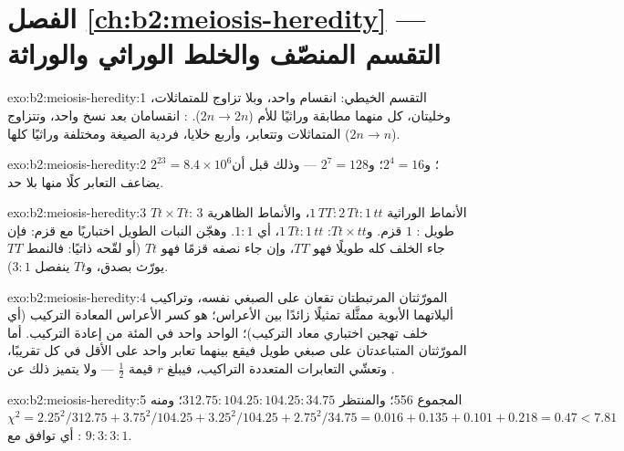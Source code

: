\section*{الفصل \ref{ch:b2:meiosis-heredity} --- التقسم المنصّف والخلط الوراثي والوراثة}

\begin{solution}{exo:b2:meiosis-heredity:1}
التقسم الخيطي: انقسام واحد، وبلا تزاوج للمتماثلات، وخليتان، كل منهما
مطابقة وراثيًا للأم ($2n \to 2n$). : انقسامان بعد نسخ
واحد، وتتزاوج المتماثلات وتتعابر، وأربع خلايا، فردية الصيغة ومختلفة
وراثيًا كلها ($2n \to n$).
\end{solution}

\begin{solution}{exo:b2:meiosis-heredity:2}
$2^{23} = 8.4\times 10^{6}$؛ و$2^{4} = 16$؛ و$2^{7} = 128$ --- وذلك
قبل أن يضاعف التعابر كلًا منها بلا حد.
\end{solution}

\begin{solution}{exo:b2:meiosis-heredity:3}
$Tt\times Tt$: الأنماط الوراثية $1\,TT : 2\,Tt : 1\,tt$، والأنماط
الظاهرية $3$ طويل : $1$ قزم. و$Tt\times tt$: $1\,Tt : 1\,tt$، أي
$1 : 1$. وهجّن النبات الطويل اختباريًا مع قزم: فإن جاء الخلف كله
طويلًا فهو $TT$، وإن جاء نصفه قزمًا فهو $Tt$ (أو لقّحه ذاتيًا:
فالنمط $TT$ يورّث بصدق، و$Tt$ ينفصل $3 : 1$).
\end{solution}

\begin{solution}{exo:b2:meiosis-heredity:4}
المورّثتان المرتبطتان تقعان على الصبغي نفسه، وتراكيب أليلاتهما
الأبوية ممثَّلة تمثيلًا زائدًا بين الأعراس؛  هو
كسر الأعراس المعادة التركيب (أي خلف تهجين اختباري معاد التركيب)؛
 الواحد واحد في المئة من إعادة التركيب. أما المورّثتان
المتباعدتان على صبغي طويل فيقع بينهما تعابر واحد على الأقل في كل
 تقريبًا، وتعشّي التعابرات المتعددة التراكيب، فيبلغ $r$
قيمة $\tfrac12$ --- ولا يتميز ذلك عن .
\end{solution}

\begin{solution}{exo:b2:meiosis-heredity:5}
المجموع 556؛ والمنتظر $312.75 : 104.25 : 104.25 : 34.75$؛ ومنه $\chi^2 =
2.25^2/312.75 + 3.75^2/104.25 + 3.25^2/104.25 + 2.75^2/34.75 = 0.016
+ 0.135 + 0.101 + 0.218 = 0.47 < 7.81$: أي توافق مع $9 : 3 : 3 :
1$.
\end{solution}

